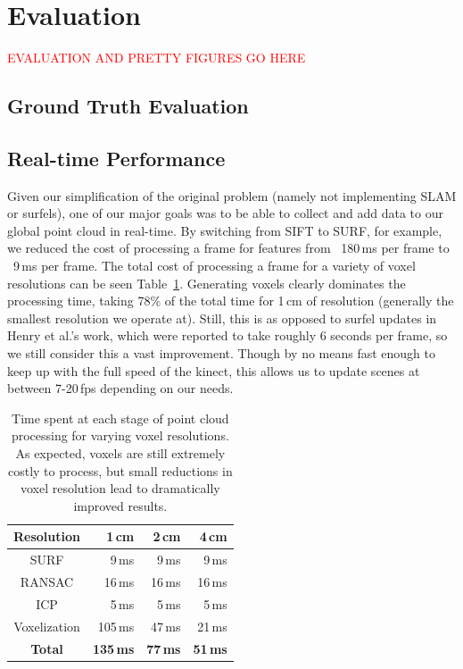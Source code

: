 \documentclass[letterpaper, 10pt, conference]{ieeeconf}
\newcommand{\xxx}[1]{\textcolor{red}{#1}}
\begin{document}
\section{Evaluation}
\xxx{EVALUATION AND PRETTY FIGURES GO HERE}
\subsection{Ground Truth Evaluation}

\subsection{Real-time Performance}
Given our simplification of the original problem (namely not implementing SLAM
or surfels), one of our major goals was to be able to collect and add data to
our global point cloud in real-time. By switching from SIFT to SURF, for
example, we reduced the cost of processing a frame for features from
~180\,ms per frame to ~9\,ms per frame. The total cost of processing a frame
for a variety of voxel resolutions
can be seen Table~\ref{tbl:match-times}. Generating voxels clearly dominates the
processing time, taking 78\% of the total time for 1\,cm of resolution
(generally the smallest resolution we operate at). Still, this is as opposed
to surfel updates in Henry et al.'s work, which were reported to take roughly
6 seconds per frame, so we still consider this a vast improvement. Though by
no means fast enough to keep up with the full speed of the kinect, this allows
us to update scenes at between 7-20\,fps depending on our needs.

\begin{table}
    \centering
    \begin{tabular}{ | c || r | r | r | }
    \hline
    Resolution & 1\,cm  & 2\,cm & 4\,cm \\
    \hline
    \hline
    SURF & 9\,ms &9\,ms & 9\,ms \\
    \hline
    RANSAC & 16\,ms & 16\,ms & 16\,ms\\
    \hline
    ICP & 5\,ms & 5\,ms & 5\,ms \\
    \hline
    Voxelization & 105\,ms & 47\,ms & 21\,ms \\
    \hline
    {\bf Total} & {\bf 135\,ms} & {\bf 77\,ms} & {\bf 51\,ms} \\
    \hline
    \end{tabular}
\caption{Time spent at each stage of point cloud processing for varying voxel
    resolutions. As expected, voxels are still extremely costly to process,
    but small reductions in voxel resolution lead to dramatically improved
    results.}
\label{tbl:match-times}
\end{table}
\end{document}

